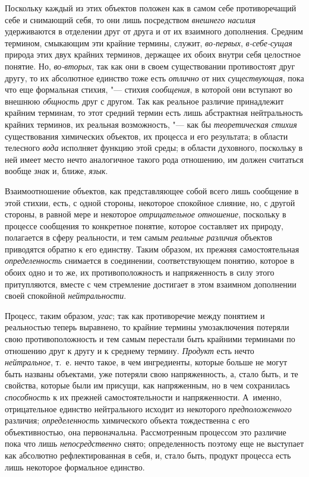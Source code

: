 {{Поскольку каждый из этих объектов положен как в самом себе
противоречащий себе и снимающий себя, то они лишь посредством
{\em внешнего насилия}
удерживаются в отделении друг от друга и от их
взаимного дополнения. Средним термином, смыкающим эти
крайние термины, служит,
{\em во-первых},
{\em в-себе-сущая} природа
этих двух крайних терминов, держащее их обоих внутри себя целостное
понятие. Но, {\em во-вторых},
так как они в своем существовании противостоят друг другу, то
их абсолютное единство тоже есть
{\em отлично} от них
{\em существующая}, пока
что еще формальная стихия, "--- стихия
{\em сообщения}, в
которой они вступают во внешнюю
{\em общность} друг с
другом. Так как реальное различие принадлежит крайним терминам, то этот
средний термин есть лишь абстрактная нейтральность крайних терминов, их
реальная возможность, "--- как бы
{\em теоретическая стихия}
существования химических объектов, их процесса и его
результата; в области телесного
{\em вода} исполняет
функцию этой среды; в области духовного, поскольку в ней имеет место нечто
аналогичное такого рода отношению, им должен считаться вообще
{\em знак} и, ближе,
{\em язык}.

Взаимоотношение объектов, как представляющее собой всего лишь
сообщение в этой стихии, есть, с одной стороны, некоторое спокойное
слияние, но, с другой стороны, в равной мере и некоторое
{\em отрицательное отношение},
поскольку в процессе сообщения то конкретное понятие, которое
составляет их природу, полагается в сферу реальности, и тем самым
{\em реальные различия}
объектов приводятся обратно к его единству. Таким образом, их
прежняя самостоятельная
{\em определенность}
снимается в соединении, соответствующем понятию, которое в
обоих одно и то же, их противоположность и напряженность в силу этого
притупляются, вместе с чем стремление достигает в этом взаимном дополнении
своей спокойной {\em нейтральности}.

Процесс, таким образом,
{\em угас}; так как
противоречие между понятием и реальностью теперь выравнено, то крайние
термины умозаключения потеряли свою противоположность и тем самым перестали
быть крайними терминами по отношению друг к другу и к среднему термину.
{\em Продукт} есть нечто
{\em нейтральное}, т.~е.
нечто такое, в чем ингредиенты, которые больше не могут быть названы
объектами, уже потеряли свою напряженность, а, стало быть, и те свойства,
которые были им присущи, как напряженным, но в чем сохранилась
{\em способность} к их
прежней самостоятельности и напряженности. А~именно, отрицательное единство
нейтрального исходит из некоторого
{\em предположенного}
различия;
{\em определенность}
химического объекта тождественна с его объективностью, она
первоначальна. Рассмотренным процессом это различие пока что лишь
{\em непосредственно}
снято; определенность поэтому еще не выступает
как абсолютно рефлектированная в себя, и, стало быть, продукт процесса есть
лишь некоторое формальное единство.

}}
